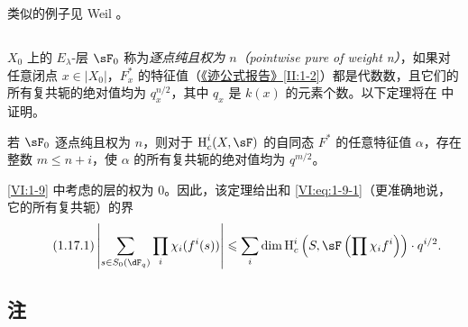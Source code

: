 类似的例子见 Weil \cite[App V]{we74}。

\subsection{}\label{VI:1-16}

$X_0$ 上的 $E_\lambda$-层 $\sF_0$ 称为\emph{逐点纯且权为 $n$（pointwise pure of weight n）}，如果对任意闭点 $x\in |X_0|$，$F_x^\ast$ 的特征值（\hyperref[II]{《迹公式报告》}\ref{II:1-2}）都是代数数，且它们的所有复共轭的绝对值均为 $q_x^{n/2}$，其中 $q_x$ 是 $k(x)$ 的元素个数。以下定理将在 \cite{de80} 中证明。

\begin{theorem_}\label{VI:1-17}
若 $\sF_0$ 逐点纯且权为 $n$，则对于 $\h_c^i(X,\sF)$ 的自同态 $F^\ast$ 的任意特征值 $\alpha$，存在整数 $m\leqslant n+i$，使 $\alpha$ 的所有复共轭的绝对值均为 $q^{m/2}$。
\end{theorem_}

\ref{VI:1-9} 中考虑的层的权为 $0$。因此，该定理给出和 \ref{VI:eq:1-9-1}（更准确地说，它的所有复共轭）的界
\begin{equation*}\tag{1.17.1}\label{VI:eq:1-17-1}
  \left|\sum_{s\in S_0(\dF_q)} \prod_i \chi_i(f^i(s)) \right| \leqslant \sum_i \dim \h_c^i\left(S,\sF\left(\prod \chi_i f^i\right)\right)\cdot q^{i/2} \text{.}
\end{equation*}

\subsection{注}\label{VI:1-18}

